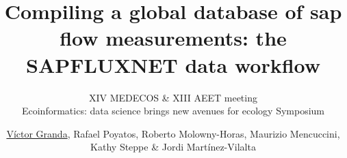 \usepackage{textpos}
\usepackage{fontspec}

\setsansfont{Raleway}

\title[The SAPFLUXNET data workflow]{Compiling a global database of sap flow measurements: the SAPFLUXNET data workflow}
\subtitle{XIV MEDECOS \& XIII AEET meeting\\Ecoinformatics: data science brings new avenues for ecology Symposium}
\author[Víctor Granda \emph{et al.}]{\underline{Víctor Granda}, Rafael Poyatos, Roberto Molowny-Horas, Maurizio Mencuccini, Kathy Steppe \& Jordi Martínez-Vilalta}

